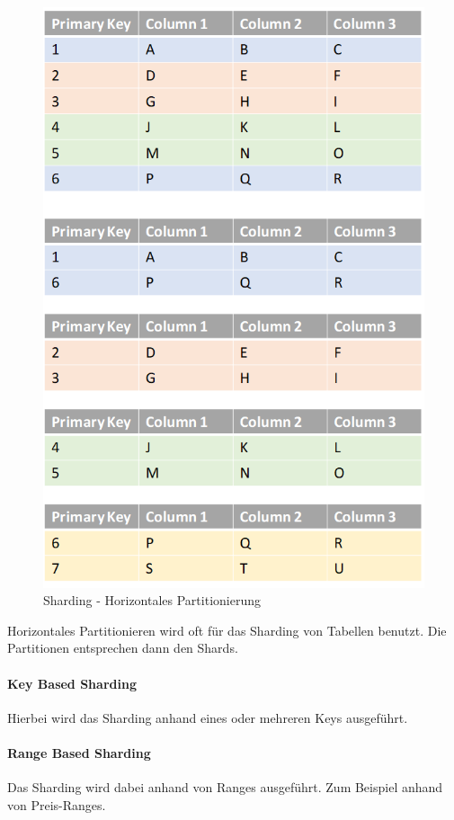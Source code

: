 \begin{flushleft}
\begin{figure}[H]
        \includegraphics[width=0.8\linewidth]{source/implementation/evaluation/excursus_architecture/sharding_horizontal_partitioning}
        \caption{Sharding - Horizontales Partitionierung}
        \label{fig:sharding_horizontal_partitioning}
    \end{figure}
    Horizontales Partitionieren wird oft für das Sharding von Tabellen benutzt.
    Die Partitionen entsprechen dann den Shards.
\begin{flushleft}
\end{flushleft}
    \paragraph{Key Based Sharding}
    Hierbei wird das Sharding anhand eines oder mehreren Keys ausgeführt.
\begin{flushleft}
\end{flushleft}
    \paragraph{Range Based Sharding}
    Das Sharding wird dabei anhand von Ranges ausgeführt.
    Zum Beispiel anhand von Preis-Ranges.
\begin{flushleft}
\end{flushleft}

\end{flushleft}
